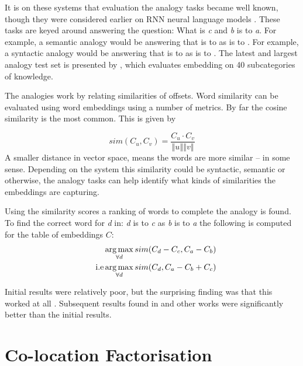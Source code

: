 \documentclass[parskip]{komatufte}
\begin{document}
It is on these systems that evaluation the analogy tasks became well known, though they were considered earlier on RNN neural language models .
These tasks are keyed around answering the question: What is  \emph{c} and \emph{b} is to \emph{a}.
For example, a semantic analogy would be answering that  is to  as  is to .
For example, a syntactic analogy would be answering that  is to  as  is to .
The latest and largest analogy test set is presented by ,
which evaluates embedding on 40 subcategories of knowledge.




The analogies work by relating similarities of offsets.
Word similarity can be evaluated using word embeddings using a number of metrics.
By far the cosine similarity is the most common.
This is given by 

\begin{equation}
sim(C_u, C_v)=\frac{C_{u}\cdot C_{v}}{\left\Vert u\right\Vert \left\Vert v\right\Vert }
\end{equation}
A smaller distance in vector space, means the words are more similar -- in some sense.
Depending on the system this similarity could be syntactic, semantic or otherwise, the analogy tasks can help identify what kinds of similarities the embeddings are capturing.

Using the similarity scores a ranking of words to complete the analogy is found.
To find the correct word for \emph{d} in: \emph{d} is to \emph{c} as \emph{b} is to \emph{a}
the following is computed for the table of embeddings $C$:
\begin{align}
\qquad & \operatorname*{arg\,max}_{\forall d} sim(C_d - C_c, C_a-C_b)\\
\text{i.e} & \operatorname*{arg\,max}_{\forall d} sim(C_d, C_a-C_b+C_c)
\end{align}



Initial results were relatively poor, but the surprising finding was that this worked at all \cite{mikolov2013linguisticsubstructures}.
Subsequent results found in  and other works were significantly better than the initial results.

\section{Co-location Factorisation}
\end{document}
